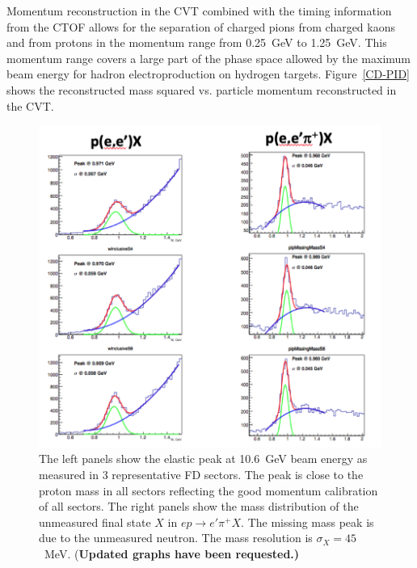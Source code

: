 \documentclass[final,3p,twocolumn]{elsarticle}
\begin{document}
Momentum reconstruction in the CVT combined with the timing information from the CTOF allows for the separation 
of charged pions from charged kaons and from protons in the momentum range from 0.25~GeV to 1.25~GeV. This
momentum range covers a large part of the phase space allowed by the maximum beam energy for hadron
electroproduction on hydrogen targets. Figure~\ref{CD-PID} shows the reconstructed mass squared vs. 
particle momentum reconstructed in the CVT.
\begin{figure}[t!]
\centerline{\includegraphics[width=1.0\columnwidth]{elastic_pi+n.png}}
\caption{The left panels show the elastic peak at 10.6~GeV beam energy as measured in 3 representative FD
  sectors. The peak is close to the proton mass in all sectors reflecting the good momentum calibration of all
  sectors. The right panels show the mass distribution of the unmeasured final state $X$ in $ep \to e'\pi^+ X$.
  The missing mass peak is due to the unmeasured neutron. The mass resolution is $\sigma_X = 45$~MeV.
  {(\bf Updated graphs have been requested.)}}
\label{elastic-peak}


\end{figure}
\end{document}
